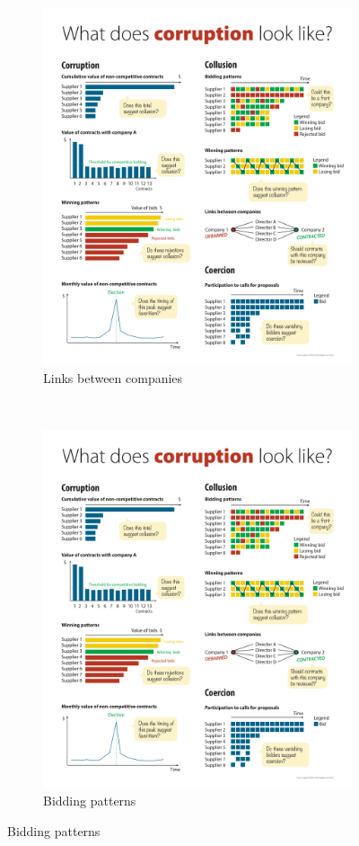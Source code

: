 \begin{figure}[H]
\begin{subfigure}[t]{0.5\textwidth}
\end{subfigure}
~
\begin{subfigure}[t]{0.5\textwidth}
\caption{Links between companies }
\includegraphics[max width=1\textwidth]{../img/poster_link.pdf}
\end{subfigure}
~
\begin{subfigure}[t]{0.5\textwidth}
\caption{Bidding patterns}
\includegraphics[max width=1\textwidth]{../img/poster_bidding_patt.pdf}

\end{subfigure}
\end{figure}

